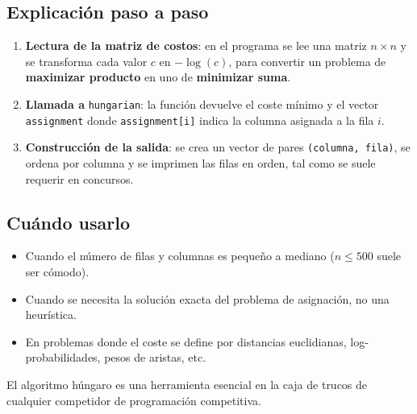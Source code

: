 \subsection*{Explicación paso a paso}
\begin{enumerate}
    \item \textbf{Lectura de la matriz de costos}: en el programa se lee una matriz $n\times n$ y se transforma cada valor $c$ en $-\log(c)$, para convertir un problema de \textbf{maximizar producto} en uno de \textbf{minimizar suma}.
    \item \textbf{Llamada a} \texttt{hungarian}: la función devuelve el coste mínimo y el vector \texttt{assignment} donde \texttt{assignment[i]} indica la columna asignada a la fila $i$.
    \item \textbf{Construcción de la salida}: se crea un vector de pares \texttt{(columna, fila)}, se ordena por columna y se imprimen las filas en orden, tal como se suele requerir en concursos.
\end{enumerate}

\subsection*{Cuándo usarlo}
\begin{itemize}
    \item Cuando el número de filas y columnas es pequeño a mediano ($n \leq 500$ suele ser cómodo).
    \item Cuando se necesita la solución exacta del problema de asignación, no una heurística.
    \item En problemas donde el coste se define por distancias euclidianas, log-probabilidades, pesos de aristas, etc.
\end{itemize}

El algoritmo húngaro es una herramienta esencial en la caja de trucos de cualquier competidor de programación competitiva.
